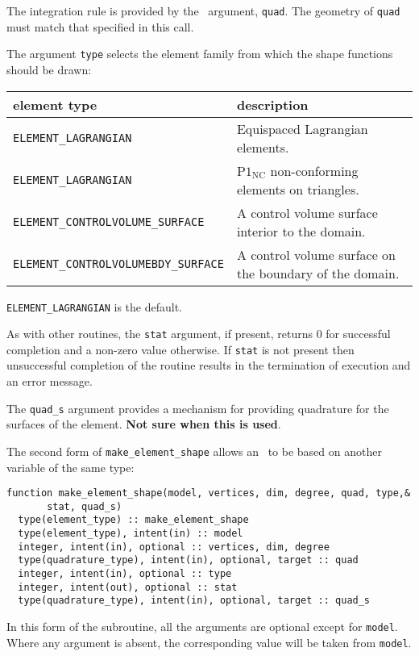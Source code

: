 \documentclass[a4paper, 11pt]{book}
\begin{document}
The integration rule is provided by the \quadraturetype\ argument,
\lstinline+quad+. The geometry of \lstinline+quad+ must match that specified
in this call. 

The argument \lstinline+type+ selects the element family from which the shape
functions should be drawn:

\begin{center}
  \begin{tabular}{ll}
    \textbf{element type} & \textbf{description} \\\hline
    \lstinline+ELEMENT_LAGRANGIAN+ & Equispaced Lagrangian elements.\\
    \lstinline+ELEMENT_LAGRANGIAN+ & $\mathrm{P}1_\mathrm{NC}$
    non-conforming elements on triangles.\\
    \lstinline+ELEMENT_CONTROLVOLUME_SURFACE+ & A control
    volume surface interior to the domain.\\
    \lstinline+ELEMENT_CONTROLVOLUMEBDY_SURFACE+ & A control volume surface
    on the boundary of the domain.
  \end{tabular}
\end{center}

\lstinline+ELEMENT_LAGRANGIAN+ is the default.

As with other routines, the \lstinline+stat+ argument, if present, returns 0
for successful completion and a non-zero value otherwise. If
\lstinline+stat+ is not present then unsuccessful completion of the routine
results in the termination of execution and an error message.

The \lstinline+quad_s+ argument provides a mechanism for providing
quadrature for the surfaces of the element. \textbf{Not sure when this is
  used}.

The second form of \lstinline+make_element_shape+ allows an \elementtype\
to be based on another variable of the same type:

\begin{lstlisting}
function make_element_shape(model, vertices, dim, degree, quad, type,&
       stat, quad_s)  
  type(element_type) :: make_element_shape
  type(element_type), intent(in) :: model
  integer, intent(in), optional :: vertices, dim, degree
  type(quadrature_type), intent(in), optional, target :: quad
  integer, intent(in), optional :: type
  integer, intent(out), optional :: stat
  type(quadrature_type), intent(in), optional, target :: quad_s
\end{lstlisting}

In this form of the subroutine, all the arguments are optional except for
\lstinline+model+. Where any argument is absent, the corresponding value
will be taken from \lstinline+model+.
\end{document}
